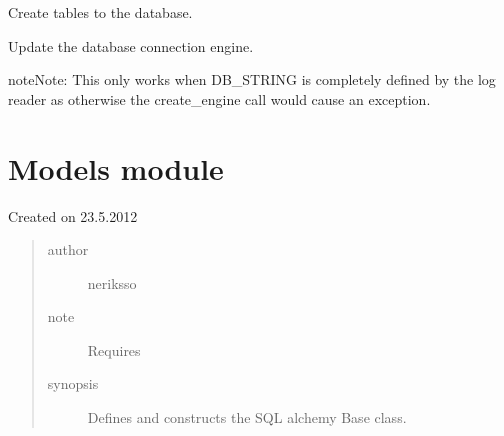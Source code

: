 \documentclass[letterpaper,10pt,english]{sphinxmanual}
\begin{document}

\begin{fulllineitems}
\label{modelsbase:modelsbase.create_all}
Create tables to the database.

\end{fulllineitems}


\begin{fulllineitems}
\label{modelsbase:modelsbase.update_database}
Update the database connection engine.

\begin{notice}{note}{Note:}
This only works when DB\_STRING is completely defined by
the log reader as otherwise the create\_engine call would
cause an exception.
\end{notice}

\end{fulllineitems}



\section{Models module}
\label{models:module-models}\label{models::doc}\label{models:models-module}
Created on 23.5.2012
\begin{quote}\begin{description}
\item[{author}] \leavevmode
neriksso

\item[{note}] \leavevmode
Requires 

\item[{synopsis}] \leavevmode
Defines and constructs the SQL alchemy Base class.

\end{description}\end{quote}
\end{document}
